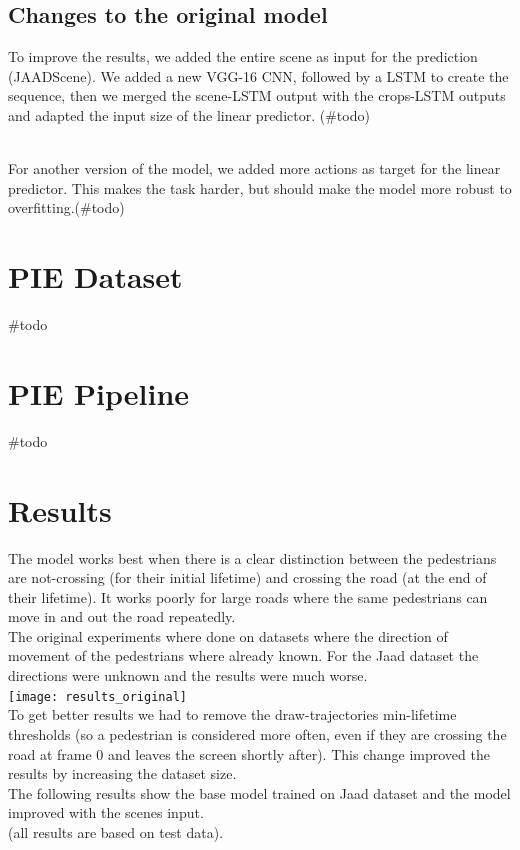 \documentclass[11pt]{article}
\begin{document}
\subsection*{Changes to the original model}
To improve the results, we added the entire scene as input for the prediction (JAADScene).
We added a new VGG-16 CNN, followed by a LSTM to create the sequence, then we merged the scene-LSTM output with the crops-LSTM
outputs and adapted the input size of the linear predictor. (\#todo) %

\\
For another version of the model, we added more actions as target for the linear predictor.
This makes the task harder, but should make the model more robust to overfitting.(\#todo) %


\section{PIE Dataset}
\#todo

\section{PIE Pipeline}
\#todo


\section{Results}
    The model works best when there is a clear distinction between the pedestrians are not-crossing (for their initial lifetime)
    and crossing the road (at the end of their lifetime).
    It works poorly for large roads where the same pedestrians can move in and out the road repeatedly.\\
    The original experiments where done on datasets where the direction of movement of the pedestrians where already known.
    For the Jaad dataset the directions were unknown and the results were much worse.\\
    \texttt{[image: results\_original]}\\
    To get better results we had to remove the draw-trajectories min-lifetime thresholds (so a pedestrian is considered more often, even if they are
    crossing the road at frame 0 and leaves the screen shortly after).
    This change improved the results by increasing the dataset size.\\
    The following results show the base model trained on Jaad dataset and the model improved with the scenes input.\\
    (all results are based on test data).
\end{document}
